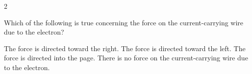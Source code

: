 \documentclass{../../../oss-apphys-exam}
\begin{document}
\begin{multicols*}{2}
\begin{questions}
\begin{choices}
      \choice
    \end{choices}
    \vspace{.7in}
    
    \question Which of the following is true concerning the force on the
    current-carrying wire due to the electron?
    \begin{center}
    \end{center}
    \begin{choices}
      \choice The force is directed toward the right.
      \choice The force is directed toward the left.
      \choice The force is directed into the page.
      \choice There is no force on the current-carrying wire due to the
      electron.
    \end{choices}
    \columnbreak
    

\end{questions}
\end{multicols*}
\end{document}
